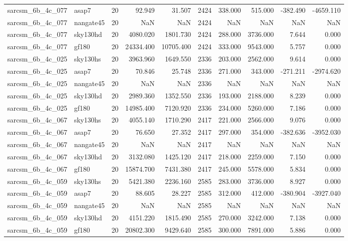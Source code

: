 \begin{tabular}{llrrrrrrrr}
sarcsm\_6b\_4c\_077 & asap7 & 20 & 92.949 & 31.507 & 2424 & 338.000 & 515.000 & -382.490 & -4659.110 \\
sarcsm\_6b\_4c\_077 & nangate45 & 20 & NaN & NaN & 2424 & NaN & NaN & NaN & NaN \\
sarcsm\_6b\_4c\_077 & sky130hd & 20 & 4080.020 & 1801.730 & 2424 & 288.000 & 3736.000 & 7.644 & 0.000 \\
sarcsm\_6b\_4c\_077 & gf180 & 20 & 24334.400 & 10705.400 & 2424 & 333.000 & 9543.000 & 5.757 & 0.000 \\
sarcsm\_6b\_4c\_025 & sky130hs & 20 & 3963.960 & 1649.550 & 2336 & 203.000 & 2562.000 & 9.614 & 0.000 \\
sarcsm\_6b\_4c\_025 & asap7 & 20 & 70.846 & 25.748 & 2336 & 271.000 & 343.000 & -271.211 & -2974.620 \\
sarcsm\_6b\_4c\_025 & nangate45 & 20 & NaN & NaN & 2336 & NaN & NaN & NaN & NaN \\
sarcsm\_6b\_4c\_025 & sky130hd & 20 & 2989.360 & 1352.550 & 2336 & 193.000 & 2188.000 & 8.239 & 0.000 \\
sarcsm\_6b\_4c\_025 & gf180 & 20 & 14985.400 & 7120.920 & 2336 & 234.000 & 5260.000 & 7.186 & 0.000 \\
sarcsm\_6b\_4c\_067 & sky130hs & 20 & 4055.140 & 1710.290 & 2417 & 221.000 & 2566.000 & 9.076 & 0.000 \\
sarcsm\_6b\_4c\_067 & asap7 & 20 & 76.650 & 27.352 & 2417 & 297.000 & 354.000 & -382.636 & -3952.030 \\
sarcsm\_6b\_4c\_067 & nangate45 & 20 & NaN & NaN & 2417 & NaN & NaN & NaN & NaN \\
sarcsm\_6b\_4c\_067 & sky130hd & 20 & 3132.080 & 1425.120 & 2417 & 218.000 & 2259.000 & 7.150 & 0.000 \\
sarcsm\_6b\_4c\_067 & gf180 & 20 & 15874.700 & 7431.380 & 2417 & 245.000 & 5578.000 & 5.834 & 0.000 \\
sarcsm\_6b\_4c\_059 & sky130hs & 20 & 5421.380 & 2236.160 & 2585 & 283.000 & 3736.000 & 8.927 & 0.000 \\
sarcsm\_6b\_4c\_059 & asap7 & 20 & 88.605 & 28.227 & 2585 & 312.000 & 412.000 & -380.904 & -3927.040 \\
sarcsm\_6b\_4c\_059 & nangate45 & 20 & NaN & NaN & 2585 & NaN & NaN & NaN & NaN \\
sarcsm\_6b\_4c\_059 & sky130hd & 20 & 4151.220 & 1815.490 & 2585 & 270.000 & 3242.000 & 7.138 & 0.000 \\
sarcsm\_6b\_4c\_059 & gf180 & 20 & 20802.300 & 9429.640 & 2585 & 300.000 & 7891.000 & 5.886 & 0.000 \\

\end{tabular}
